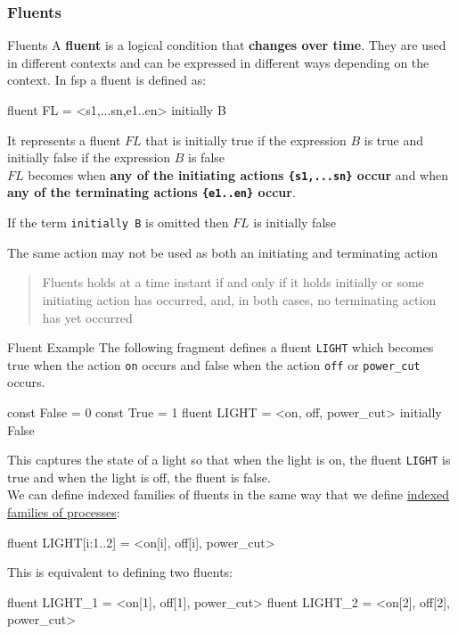 \subsubsection{Fluents}\label{sub:an_fluents} %
\begin{definition}{Fluents}{}
    A \textbf{fluent} is a logical condition that \textbf{changes over time}.
    They are used in different contexts and can be expressed in different ways depending on the context.
    \emptyln{}
    In \ac{fsp} a fluent is defined as:
    \begin{codeblock}[fsp]{}
    fluent FL = <{s1,...sn},{e1..en}> initially B
    \end{codeblock}
    It represents a fluent $FL$ that is initially true if the expression $B$ is true and initially false if the expression $B$ is false
    \\
    $FL$ becomes  when \textbf{any of the initiating actions \texttt{\{s1,...sn\}} occur} and  when \textbf{any of the terminating actions \texttt{\{e1..en\}} occur}.
    \begin{note}
        If the term \texttt{initially B} is omitted then $FL$ is initially false
        \begin{critical}
            The same action may not be used as both an initiating and terminating action
        \end{critical}
    \end{note}
\end{definition}
\begin{quote}
    Fluents holds at a time instant if and only if it holds initially or some initiating action has occurred, and, in both cases, no terminating action has yet occurred
\end{quote}
\begin{example}{Fluent Example}{}
    The following fragment defines a fluent \texttt{LIGHT} which becomes true when the action \texttt{on} occurs and false when the action \texttt{off} or \texttt{power\_cut} occurs.
    \begin{codeblock}[fsp]{}
    const False = 0
    const True = 1
    fluent LIGHT = <{on}, {off, power_cut}> initially False
    \end{codeblock}
    This captures the state of a light so that when the light is on, the fluent \texttt{LIGHT} is true and when the light is off, the fluent is false.
    \\
    We can define indexed families of fluents in the same way that we define \hyperref[sub:md_indexed_processes_and_actions]{indexed families of processes}:
    \begin{codeblock}[fsp]{}
    fluent LIGHT[i:1..2] = <{on[i]}, {off[i], power_cut}>
    \end{codeblock}
    This is equivalent to defining two fluents:
    \begin{codeblock}[fsp]{}
    fluent LIGHT_1 = <{on[1]}, {off[1], power_cut}>
    fluent LIGHT_2 = <{on[2]}, {off[2], power_cut}>
    \end{codeblock}
\end{example}
%
